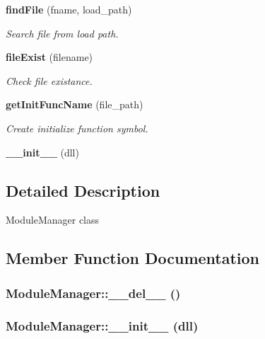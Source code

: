 \begin{CompactItemize}
{\bf find\-File} (fname, load\_\-path)
\begin{CompactList}\small\item\em Search file from load path. \item\end{CompactList}\item 
{\bf file\-Exist} (filename)
\begin{CompactList}\small\item\em Check file existance. \item\end{CompactList}\item 
{\bf get\-Init\-Func\-Name} (file\_\-path)
\begin{CompactList}\small\item\em Create initialize function symbol. \item\end{CompactList}\item 
{\bf \_\-\_\-init\_\-\_\-} (dll)
\end{CompactItemize}


\subsection{Detailed Description}
Module\-Manager class



\subsection{Member Function Documentation}
\subsubsection{\setlength{\rightskip}{0pt plus 5cm}Module\-Manager::\_\-\_\-del\_\-\_\- ()}\label{classModuleManager_ModuleManagera1}


\subsubsection{\setlength{\rightskip}{0pt plus 5cm}Module\-Manager::\_\-\_\-init\_\-\_\- (dll)}\label{classModuleManager_ModuleManagera26}


